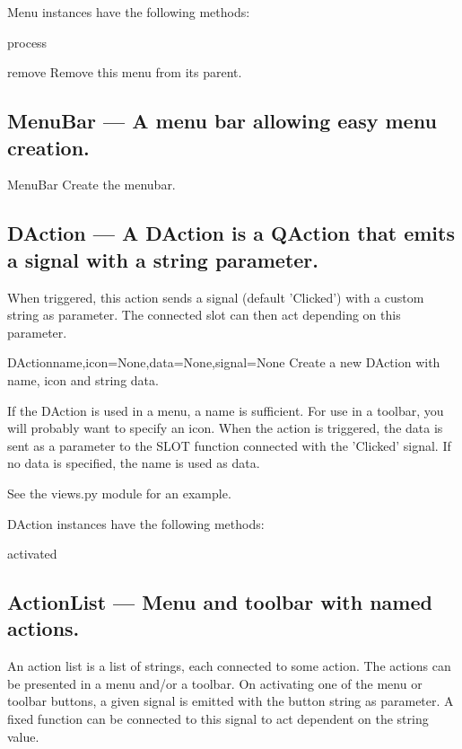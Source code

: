 Menu instances have the following methods:

\begin{funcdesc}{process}{}

\end{funcdesc}

\begin{funcdesc}{remove}{}
Remove this menu from its parent.
\end{funcdesc}

\subsection{MenuBar --- A menu bar allowing easy menu creation.}


\begin{classdesc}{MenuBar}{}
Create the menubar.
\end{classdesc}

\subsection{DAction --- A DAction is a QAction that emits a signal with a string parameter.}
    When triggered, this action sends a signal (default 'Clicked') with a
    custom string as parameter. The connected slot can then act depending
    on this parameter.
    

\begin{classdesc}{DAction}{name,icon=None,data=None,signal=None}
Create a new DAction with name, icon and string data.

        If the DAction is used in a menu, a name is sufficient. For use
        in a toolbar, you will probably want to specify an icon.
        When the action is triggered, the data is sent as a parameter to
        the SLOT function connected with the 'Clicked' signal.
        If no data is specified, the name is used as data. 
        
        See the views.py module for an example.
        
\end{classdesc}

DAction instances have the following methods:

\begin{funcdesc}{activated}{}

\end{funcdesc}

\subsection{ActionList --- Menu and toolbar with named actions.}
    An action list is a list of strings, each connected to some action.
    The actions can be presented in a menu and/or a toolbar.
    On activating one of the menu or toolbar buttons, a given signal is
    emitted with the button string as parameter. A fixed function can be
    connected to this signal to act dependent on the string value.
    

